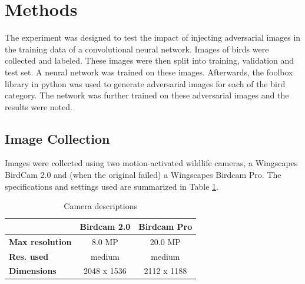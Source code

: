 \documentclass[11pt]{article}
\begin{document}
\section{Methods}
\label{sec:methods}

The experiment was designed to test the impact of injecting adversarial images in the training data of a convolutional neural network. Images of birds were collected and labeled. These images were then split into training, validation and test set. A neural network was trained on these images. Afterwards, the foolbox library in python was used to generate adversarial images for each of the bird category. The network was further trained on these adversarial images and the results were noted. 


\subsection{Image Collection}

Images were collected using two motion-activated wildlife cameras, a Wingscapes BirdCam 2.0 and (when the original failed) a Wingscapes Birdcam Pro. The
specifications and settings used are summarized in Table \ref{table:cameras}.
\begin{table}[H]
  \caption{Camera descriptions}
  \label{table:cameras}
  \begin{center}
    \begin{tabular}{|>{\footnotesize}l|>{\footnotesize}c|>{\footnotesize}c|}
      \hline
      & \bf{Birdcam 2.0} & \bf{Birdcam Pro} \\ \hline
      \bf{Max resolution} & 8.0 MP & 20.0 MP \\ \hline
      \bf{Res. used} & medium & medium \\ \hline
      \bf{Dimensions} & 2048 x 1536 & 2112 x 1188 \\ \hline
    \end{tabular}
  \end{center}
\end{table} 
\end{document}
